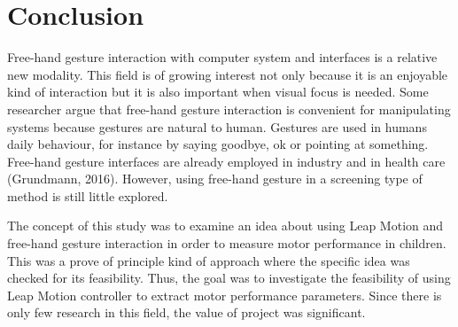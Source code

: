 \chapter{Conclusion}
\label{chap:conclusion}




Free-hand gesture interaction with computer system and interfaces is a relative new modality. This field is of growing interest not only because it is an enjoyable kind of interaction but it is also important when visual focus is needed. Some researcher argue that free-hand gesture interaction is convenient for manipulating systems because gestures are natural to human. Gestures are used in humans daily behaviour, for instance by saying goodbye, ok or pointing at something. 
Free-hand gesture interfaces are already employed in industry and in health care (Grundmann, 2016). However, using free-hand gesture in a screening type of method is still little explored.

The concept of this study was to examine an idea about using Leap Motion and free-hand gesture interaction in order to measure motor performance in children. This was a prove of principle kind of approach where the specific idea was checked for its feasibility. Thus, the goal was to investigate the feasibility of using Leap Motion controller to extract motor performance parameters. Since there is only few research in this field, the value of project was significant.

